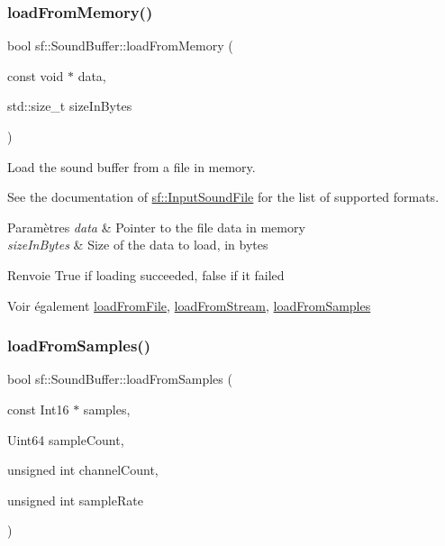 \subsubsection{\texorpdfstring{load\+From\+Memory()}{loadFromMemory()}}
{\footnotesize\ttfamily bool sf\+::\+Sound\+Buffer\+::load\+From\+Memory (\begin{DoxyParamCaption}\item[{const void $\ast$}]{data,  }\item[{std\+::size\+\_\+t}]{size\+In\+Bytes }\end{DoxyParamCaption})}



Load the sound buffer from a file in memory. 

See the documentation of \hyperlink{classsf_1_1InputSoundFile}{sf\+::\+Input\+Sound\+File} for the list of supported formats.


\begin{DoxyParams}{Paramètres}
{\em data} & Pointer to the file data in memory \\
\hline
{\em size\+In\+Bytes} & Size of the data to load, in bytes\\
\hline
\end{DoxyParams}
\begin{DoxyReturn}{Renvoie}
True if loading succeeded, false if it failed
\end{DoxyReturn}
\begin{DoxySeeAlso}{Voir également}
\hyperlink{classsf_1_1SoundBuffer_a2be6a8025c97eb622a7dff6cf2594394}{load\+From\+File}, \hyperlink{classsf_1_1SoundBuffer_ad292156b1e01f6dabd4c0c277d5e079e}{load\+From\+Stream}, \hyperlink{classsf_1_1SoundBuffer_a42d51ce4bb3b60c7ea06f63c273fd063}{load\+From\+Samples} 
\end{DoxySeeAlso}
\mbox{\label{classsf_1_1SoundBuffer_a42d51ce4bb3b60c7ea06f63c273fd063}} 
\subsubsection{\texorpdfstring{load\+From\+Samples()}{loadFromSamples()}}
{\footnotesize\ttfamily bool sf\+::\+Sound\+Buffer\+::load\+From\+Samples (\begin{DoxyParamCaption}\item[{const Int16 $\ast$}]{samples,  }\item[{Uint64}]{sample\+Count,  }\item[{unsigned int}]{channel\+Count,  }\item[{unsigned int}]{sample\+Rate }\end{DoxyParamCaption})}



